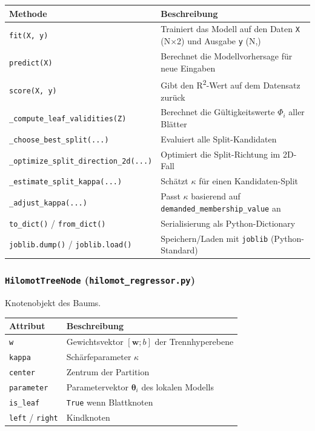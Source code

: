 \documentclass[11pt,a4paper]{report}
\begin{document}
	\begin{center}
		\begin{tabular}{p{5.5cm}p{7.5cm}}
			\toprule
			\textbf{Methode} & \textbf{Beschreibung} \\
			\midrule
			\texttt{fit(X, y)} & Trainiert das Modell auf den Daten \texttt{X} (N$\times$2) und Ausgabe \texttt{y} (N,) \\
			\texttt{predict(X)} & Berechnet die Modellvorhersage für neue Eingaben \\
			\texttt{score(X, y)} & Gibt den R\textsuperscript{2}-Wert auf dem Datensatz zurück \\
			\texttt{\_compute\_leaf\_validities(Z)} & Berechnet die Gültigkeitswerte $\Phi_i$ aller Blätter \\
			\texttt{\_choose\_best\_split(...)} & Evaluiert alle Split-Kandidaten \\
			\texttt{\_optimize\_split\_direction\_2d(...)} & Optimiert die Split-Richtung im 2D-Fall \\
			\texttt{\_estimate\_split\_kappa(...)} & Schätzt $\kappa$ für einen Kandidaten-Split \\
			\texttt{\_adjust\_kappa(...)} & Passt $\kappa$ basierend auf \texttt{demanded\_membership\_value} an \\
			\texttt{to\_dict()} / \texttt{from\_dict()} & Serialisierung als Python-Dictionary \\
			\texttt{joblib.dump()} / \texttt{joblib.load()} & Speichern/Laden mit \texttt{joblib} (Python-Standard) \\
			\bottomrule
		\end{tabular}
	\end{center}
	
	\subsubsection*{\texttt{HilomotTreeNode} (\texttt{hilomot\_regressor.py})}
	
	Knotenobjekt des Baums.
	
	\begin{center}
		\begin{tabular}{p{3.5cm}p{9cm}}
			\toprule
			\textbf{Attribut} & \textbf{Beschreibung} \\
			\midrule
			\texttt{w} & Gewichtsvektor $[\mathbf{w}; b]$ der Trennhyperebene \\
			\texttt{kappa} & Schärfeparameter $\kappa$ \\
			\texttt{center} & Zentrum der Partition \\
			\texttt{parameter} & Parametervektor $\boldsymbol{\theta}_i$ des lokalen Modells \\
			\texttt{is\_leaf} & \texttt{True} wenn Blattknoten \\
			\texttt{left} / \texttt{right} & Kindknoten \\
			\bottomrule
		\end{tabular}
	\end{center}
	
\end{document}
